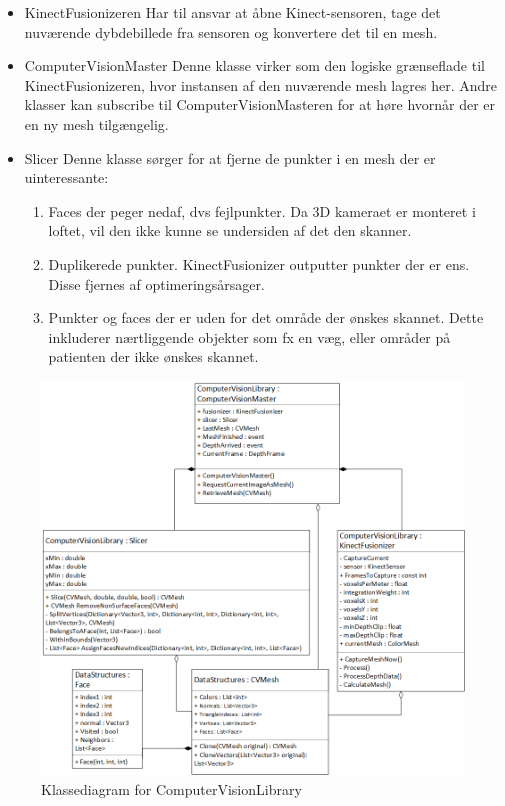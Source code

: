 \begin{itemize}
\item{KinectFusionizeren}\newline
Har til ansvar at åbne Kinect-sensoren, tage det nuværende dybdebillede fra sensoren og konvertere det til en mesh.

\item{ComputerVisionMaster}\newline
Denne klasse virker som den logiske grænseflade til KinectFusionizeren, hvor instansen af den nuværende mesh lagres her.
Andre klasser kan subscribe til ComputerVisionMasteren for at høre hvornår der er en ny mesh tilgængelig.

\item{Slicer}\newline
Denne klasse sørger for at fjerne de punkter i en mesh der er uinteressante:
\begin{enumerate}
\item{Faces der peger nedaf, dvs fejlpunkter. Da 3D kameraet er monteret i loftet, vil den ikke kunne se undersiden af det den skanner.}
\item{Duplikerede punkter. KinectFusionizer outputter punkter der er ens. Disse fjernes af optimeringsårsager.}
\item{Punkter og faces der er uden for det område der ønskes skannet. Dette inkluderer nærtliggende objekter som fx en væg, eller områder på patienten der ikke ønskes skannet.}
\end{enumerate}
\end{itemize}

\begin{figure}[H]
    \centering
    \includegraphics[width=1\textwidth]{figurer/d/Design/Class/uml_class_computervisionlibrary}
    \caption{Klassediagram for ComputerVisionLibrary}
    \label{class_ComputerVisionLib}
\end{figure}
\newpage

